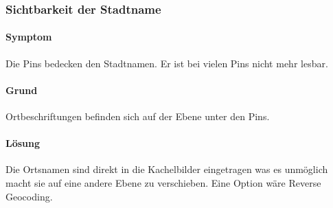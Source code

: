     \subsubsection*{Sichtbarkeit der Stadtname}
      \paragraph{Symptom}
      Die Pins bedecken den Stadtnamen. Er ist bei vielen Pins nicht mehr lesbar.

      \paragraph{Grund}
      Ortbeschriftungen befinden sich auf der Ebene unter den Pins. 

      \paragraph{Lösung}
      Die Ortsnamen sind direkt in die Kachelbilder eingetragen was es unmöglich macht sie 
      auf eine andere Ebene zu verschieben. Eine Option wäre Reverse Geocoding.
